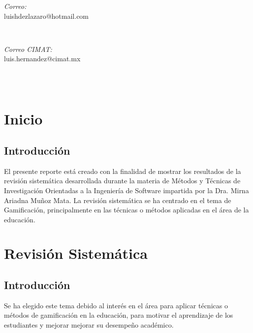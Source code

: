 \documentclass{report}
\makeatletter
\let\thedate\@date
\makeatother
\begin{document}
\begin{titlepage}
	\begin{minipage}{0.5\textwidth}
		\begin{flushleft} \large
			\emph{Correo:}\\
			luishdezlazaro@hotmail.com
		\end{flushleft}
	\end{minipage}~
	\begin{minipage}{0.4\textwidth}
		\begin{flushright} \large
			\emph{Correo CIMAT:} \\
			luis.hernandez@cimat.mx
		\end{flushright}
	\end{minipage}\\[2 cm]
		
	{\large \thedate}\\[2 cm]
 
	\vfill
	
\end{titlepage}


\tableofcontents
\pagebreak

\chapter{Inicio}
    
    \section{Introducción}
    El presente reporte está creado con la finalidad de mostrar los resultados de la revisión sistemática desarrollada durante la materia de Métodos y Técnicas de Investigación Orientadas a la Ingeniería de Software impartida por la Dra. Mirna Ariadna Muñoz Mata. La revisión sistemática se ha centrado en el tema de Gamificación, principalmente en las técnicas o métodos aplicadas en el área de la educación.\\
    
\chapter{Revisión Sistemática}

    \section{Introducción}
    Se ha elegido este tema debido al interés en el área para aplicar técnicas o métodos de gamificación en la educación, para motivar el aprendizaje de los estudiantes y mejorar mejorar su desempeño académico.\\
\end{document}
